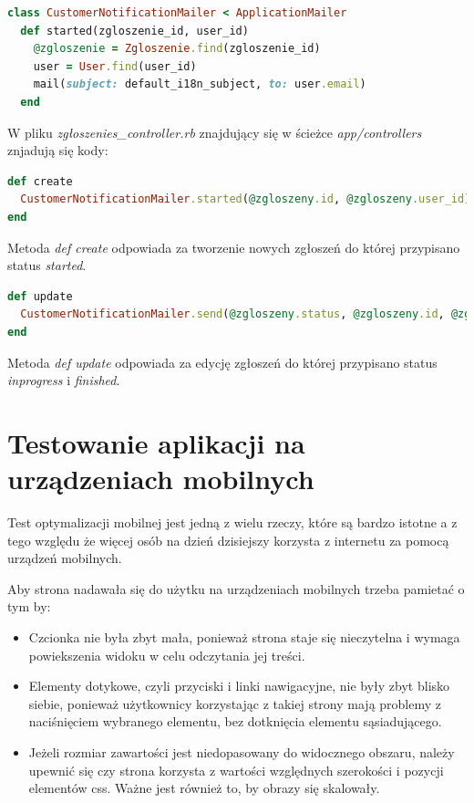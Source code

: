 \documentclass[openright]{xmgr}
\begin{document}
	\begin{lstlisting}[language=Ruby,lineskip={-1pt},caption=Opis statusów w modelu]
class CustomerNotificationMailer < ApplicationMailer
  def started(zgloszenie_id, user_id)
	@zgloszenie = Zgloszenie.find(zgloszenie_id)
	user = User.find(user_id)
	mail(subject: default_i18n_subject, to: user.email) 
  end
	\end{lstlisting} 
	
	W pliku \textit{zgłoszenies\_controller.rb} znajdujący się w ścieżce
	\textit{app/controllers} znjadują się kody:
	
	\begin{lstlisting}[language=Ruby,lineskip={-1pt},caption=Powiadomienia o przyjęciu usterki do naprawy]
def create
  CustomerNotificationMailer.started(@zgloszeny.id, @zgloszeny.user_id).deliver_later
end
	\end{lstlisting}
	
	Metoda \textit{def create} odpowiada za tworzenie nowych zgłoszeń do której przypisano status \textit{started}.
	
	\begin{lstlisting}[language=Ruby,lineskip={-1pt},caption=Powiadomienia o rozpoczeciu i zakończeniu naprawy usterki]
def update
  CustomerNotificationMailer.send(@zgloszeny.status, @zgloszeny.id, @zgloszeny.user_id).deliver_later if !@zgloszeny.started?
end
	\end{lstlisting}
	
	Metoda \textit{def update} odpowiada za edycję zgłoszeń do której przypisano status \textit{inprogress} i \textit{finished}.
	
	\chapter{Testowanie aplikacji na urządzeniach mobilnych}
	
	Test optymalizacji mobilnej jest jedną z wielu rzeczy, które są bardzo istotne a z tego względu że więcej osób na dzień dzisiejszy korzysta z internetu za pomocą urządzeń mobilnych. 

	Aby strona nadawała się do użytku na urządzeniach mobilnych trzeba pamietać o tym by:
	
	\begin{itemize}
		\item Czcionka nie była zbyt mała, ponieważ strona staje się nieczytelna i wymaga powiekszenia widoku w celu odczytania jej treści.
		\item Elementy dotykowe, czyli przyciski i linki nawigacyjne, nie były zbyt blisko siebie, ponieważ użytkownicy korzystając z takiej strony mają problemy z naciśnięciem wybranego elementu, bez dotknięcia elementu sąsiadującego.
		\item Jeżeli rozmiar zawartości jest niedopasowany do widocznego obszaru, należy upewnić się czy strona korzysta z wartości względnych szerokości i pozycji elementów css. Ważne jest również to, by obrazy się skalowały.
	\end{itemize}
	
\end{document}

